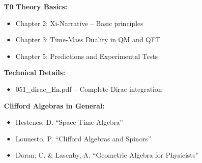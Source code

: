 	\textbf{T0 Theory Basics:}
	\begin{itemize}
		\item Chapter 2: Xi-Narrative -- Basic principles
		\item Chapter 3: Time-Mass Duality in QM and QFT
		\item Chapter 5: Predictions and Experimental Tests
	\end{itemize}
	
	\textbf{Technical Details:}
	\begin{itemize}
		\item 051\_dirac\_En.pdf -- Complete Dirac integration

	\end{itemize}
	
	\textbf{Clifford Algebras in General:}
	\begin{itemize}
		\item Hestenes, D. ``Space-Time Algebra''
		\item Lounesto, P. ``Clifford Algebras and Spinors''
		\item Doran, C. \& Lasenby, A. ``Geometric Algebra for Physicists''
	\end{itemize}
	